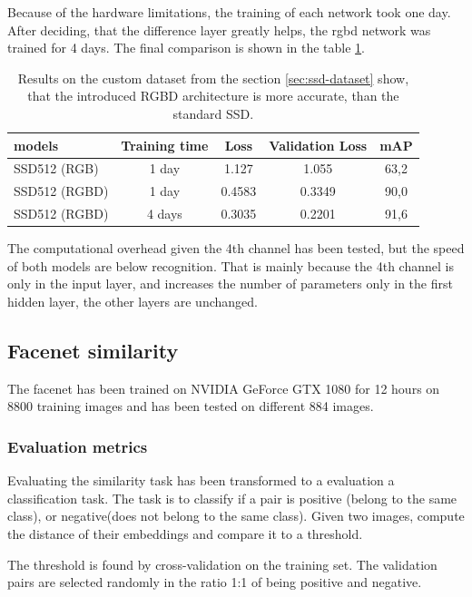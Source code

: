 \documentclass[a4paper,12pt,titlepage, twoside]{article}
\numberwithin{figure}{section}
\begin{document}
Because of the hardware limitations, the training of each network took one day. After deciding, that the difference layer greatly helps, the rgbd network was trained for 4 days. The final comparison is shown in the table \ref{tab:ssd_camparison}.

\begin{table}
\centering
\begin{tabular}{|l|c|c|c|c|}
  \hline
  models & Training time & Loss & Validation Loss & mAP \\
  \hline
  SSD512 (RGB) & 1 day & 1.127 & 1.055 & 63,2 \\
  \hline
  SSD512 (RGBD) & 1 day & 0.4583 & 0.3349 & 90,0 \\
  \hline
  SSD512 (RGBD) & 4 days & 0.3035 & 0.2201 & 91,6 \\
  \hline
\end{tabular}
\caption{Results on the custom dataset from the section \ref{sec:ssd-dataset} show, that the introduced RGBD architecture is more accurate, than the standard SSD.}
\label{tab:ssd_camparison}
\end{table}

The computational overhead given the 4th channel has been tested, but the speed of both models are below recognition. That is mainly because the 4th channel is only in the input layer, and increases the number of parameters only in the first hidden layer, the other layers are unchanged.

\subsection{Facenet similarity}
The facenet has been trained on NVIDIA GeForce GTX 1080 for 12 hours on 8800 training images and has been tested on different 884 images. 

\subsubsection{Evaluation metrics}
\label{sec:similarity-eval}
Evaluating the similarity task has been transformed to a evaluation a classification task. The task is to classify if a pair is positive (belong to the same class), or negative(does not belong to the same class). Given two images, compute the distance of their embeddings and compare it to a threshold. 

The threshold is found by cross-validation on the training set. The validation pairs are selected randomly in the ratio 1:1 of being positive and negative.
\end{document}
